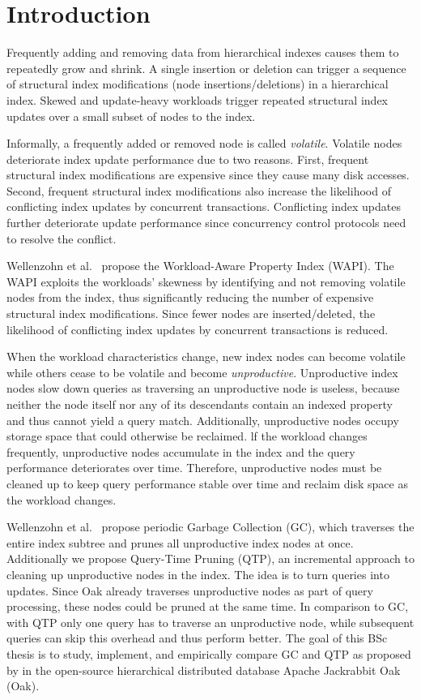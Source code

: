 \message{ !name(thesis.tex)}\documentclass[abstracton,12pt]{scrartcl}
\theoremstyle{definition}
\begin{document}
\section{Introduction}

Frequently adding and removing data from hierarchical indexes causes them to
repeatedly grow and shrink. A single insertion or deletion can trigger a
sequence of structural index modifications (node insertions/deletions) in a
hierarchical index. Skewed and update-heavy workloads trigger repeated
structural index updates over a small subset of nodes to the index.

Informally, a frequently added or removed node is called \textit{volatile}.
Volatile nodes deteriorate index update performance due to two reasons. First,
frequent structural index modifications are expensive since they cause many disk
accesses. Second, frequent structural index modifications also increase the
likelihood of conflicting index updates by concurrent transactions. Conflicting
index updates further deteriorate update performance since concurrency control
protocols need to resolve the conflict.

Wellenzohn et al.~\cite{KW17} propose the Workload-Aware Property Index (WAPI).
The WAPI exploits the workloads' skewness by identifying and not removing
volatile nodes from the index, thus significantly reducing the number of
expensive structural index modifications. Since fewer nodes are
inserted/deleted, the likelihood of conflicting index updates by concurrent
transactions is reduced.

When the workload characteristics change, new index nodes can become volatile
while others cease to be volatile and become \textit{unproductive}. Unproductive
index nodes slow down queries as traversing an unproductive node is useless,
because neither the node itself nor any of its descendants contain an indexed
property and thus cannot yield a query match. Additionally, unproductive nodes
occupy storage space that could otherwise be reclaimed. lf the workload changes
frequently, unproductive nodes accumulate in the index and the query
performance deteriorates over time. Therefore, unproductive nodes must be
cleaned up to keep query performance stable over time and reclaim disk space as
the workload changes.

Wellenzohn et al.~\cite{KW17} propose periodic Garbage Collection (GC), which
traverses the entire index subtree and prunes all unproductive index nodes at
once. Additionally we propose Query-Time Pruning (QTP), an incremental approach
to cleaning up unproductive nodes in the index. The idea is to turn queries into
updates. Since Oak already traverses unproductive nodes as part of query
processing, these nodes could be pruned at the same time. In comparison to GC,
with QTP only one query has to traverse an unproductive node, while subsequent
queries can skip this overhead and thus perform better.
The goal of this BSc thesis is to study, implement, and empirically compare GC
and QTP as proposed by \cite{KW17} in the open-source hierarchical distributed
database Apache Jackrabbit Oak (Oak).
\end{document}
